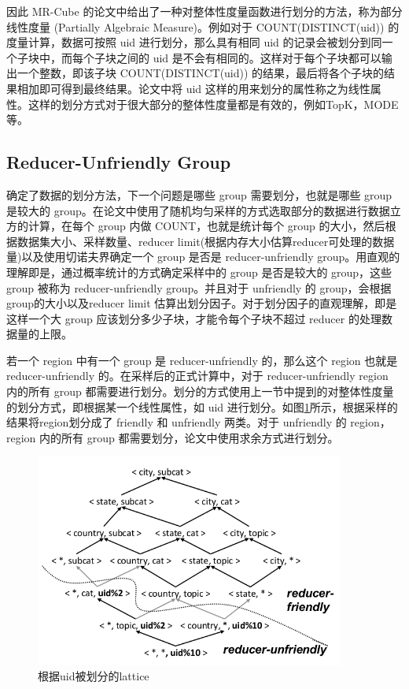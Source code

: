 因此 MR-Cube 的论文中给出了一种对整体性度量函数进行划分的方法，称为部分线性度量 (Partially Algebraic Measure)。例如对于 COUNT(DISTINCT(uid)) 的度量计算，数据可按照 uid 进行划分，那么具有相同 uid 的记录会被划分到同一个子块中，而每个子块之间的 uid 是不会有相同的。这样对于每个子块都可以输出一个整数，即该子块 COUNT(DISTINCT(uid)) 的结果，最后将各个子块的结果相加即可得到最终结果。论文中将 uid 这样的用来划分的属性称之为线性属性。这样的划分方式对于很大部分的整体性度量都是有效的，例如TopK，MODE等。


\subsection{Reducer-Unfriendly Group}

确定了数据的划分方法，下一个问题是哪些 group 需要划分，也就是哪些 group 是较大的 group。在论文中使用了随机均匀采样的方式选取部分的数据进行数据立方的计算，在每个 group 内做 COUNT，也就是统计每个 group 的大小，然后根据数据集大小、采样数量、reducer limit(根据内存大小估算reducer可处理的数据量)以及使用切诺夫界确定一个 group 是否是 reducer-unfriendly group。用直观的理解即是，通过概率统计的方式确定采样中的 group 是否是较大的 group，这些 group 被称为 reducer-unfriendly group。并且对于 unfriendly 的 group，会根据group的大小以及reducer limit 估算出划分因子。对于划分因子的直观理解，即是这样一个大 group 应该划分多少子块，才能令每个子块不超过 reducer 的处理数据量的上限。

若一个 region 中有一个 group 是 reducer-unfriendly 的，那么这个 region 也就是 reducer-unfriendly 的。在采样后的正式计算中，对于 reducer-unfriendly region 内的所有 group 都需要进行划分。划分的方式使用上一节中提到的对整体性度量的划分方式，即根据某一个线性属性，如 uid 进行划分。如图\ref{region_partition}所示，根据采样的结果将region划分成了 friendly 和 unfriendly 两类。对于 unfriendly 的 region，region 内的所有 group 都需要划分，论文中使用求余方式进行划分。

\begin{figure}[!htb]
\centering\includegraphics[width=4in]{picture/ch_datacube_mr/region_partition} 
\caption{根据uid被划分的lattice}\label{region_partition} 
\end{figure} 


